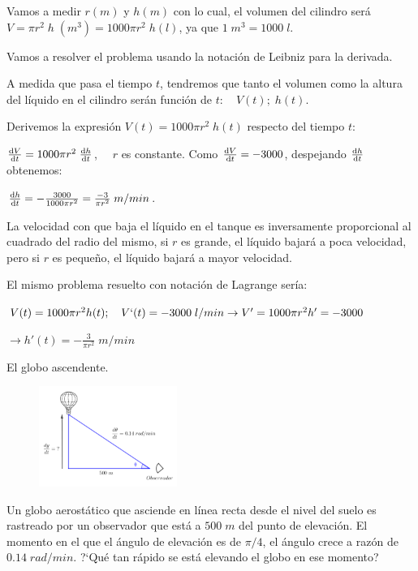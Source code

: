 	\begin{proofw}\renewcommand{\qedsymbol}{$\diamond$}
		
	Vamos a medir $r(m)$ y $h(m)$ con lo cual, el volumen del cilindro será $V=\pi r^2\; h \; (m^3) = 1000 \pi r^2\; h (l)$, ya que $1 \; m^3 = 1000 \; l$.
	
	Vamos a resolver el problema usando la notación de Leibniz para la derivada.
	
	A medida que pasa el tiempo $t$, tendremos que tanto el volumen como la altura del líquido en el cilindro serán función de $t: \quad V(t); \; h(t)$.
	
	Derivemos la expresión 	$V(t)=1000 \pi r^2 \; h(t)$ respecto del tiempo $t$:
	
	$\dv {V}{t}= 1000\pi r^2\; \dv {h}{t}$, $\quad r$ es constante. Como $\dv {V}{t}=-3000$, despejando $\dv {h}{t}$ obtenemos:
	
	$\dv {h}{t}= - \frac {3000}{1000 \pi r^2}=\frac {-3}{\pi r^2}\; m/min$.
	
	La velocidad con que baja el líquido en el tanque es inversamente proporcional al cuadrado del radio del mismo, si $r$ es grande, el líquido bajará a poca velocidad, pero si $r$ es pequeño, el líquido bajará a mayor velocidad.
	
	\textcolor{gris}{El mismo problema resuelto con notación de Lagrange sería:}
	
	\textcolor{gris}{$V(t)=1000\pi r^2 h(t); \quad V`(t)=-3000\; l/min \to V'=1000 \pi r^2 h'=-3000$}
	
	\textcolor{gris}{$ \to h'(t)=-\frac 3 {\pi r^2}\; m/min$}
		
	\end{proofw}
	
	\begin{ejre} El globo ascendente.
	
	
	
	\begin{multicols}{2}
	
	\begin{figure}[H]
	\centering
	\includegraphics[width=0.4\textwidth]{imagenes/imagenes04/globo.png}
	\end{figure}
	Un globo aerostático que asciende en línea recta desde el nivel del suelo es rastreado por un observador que está a $500\; m$  del punto de elevación. El momento en el que el ángulo de elevación es de $\pi/4$, el ángulo crece a razón de $0.14\; rad/min$. ?`Qué tan rápido se está elevando el globo en ese momento? 		
	\end{multicols}

		
	\end{ejre} 
	

